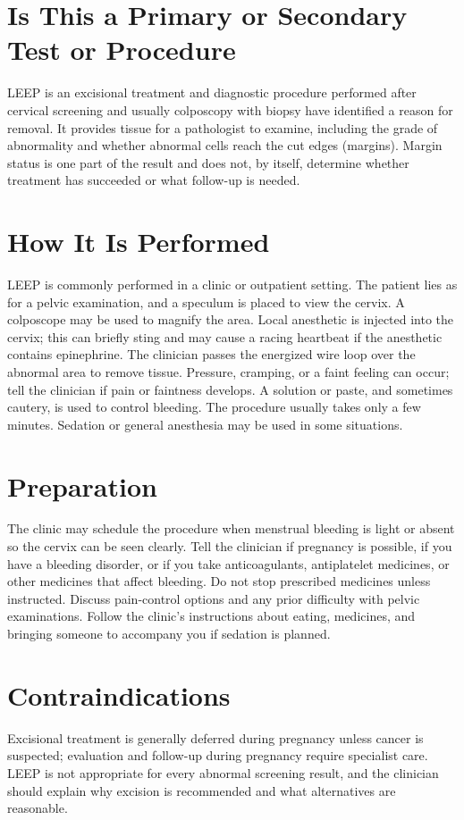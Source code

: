 \section*{Is This a Primary or Secondary Test or Procedure}
LEEP is an excisional treatment and diagnostic procedure performed after cervical screening and usually colposcopy with biopsy have identified a reason for removal. It provides tissue for a pathologist to examine, including the grade of abnormality and whether abnormal cells reach the cut edges (margins). Margin status is one part of the result and does not, by itself, determine whether treatment has succeeded or what follow-up is needed.

\section*{How It Is Performed}
LEEP is commonly performed in a clinic or outpatient setting. The patient lies as for a pelvic examination, and a speculum is placed to view the cervix. A colposcope may be used to magnify the area. Local anesthetic is injected into the cervix; this can briefly sting and may cause a racing heartbeat if the anesthetic contains epinephrine. The clinician passes the energized wire loop over the abnormal area to remove tissue. Pressure, cramping, or a faint feeling can occur; tell the clinician if pain or faintness develops. A solution or paste, and sometimes cautery, is used to control bleeding. The procedure usually takes only a few minutes. Sedation or general anesthesia may be used in some situations.

\section*{Preparation}
The clinic may schedule the procedure when menstrual bleeding is light or absent so the cervix can be seen clearly. Tell the clinician if pregnancy is possible, if you have a bleeding disorder, or if you take anticoagulants, antiplatelet medicines, or other medicines that affect bleeding. Do not stop prescribed medicines unless instructed. Discuss pain-control options and any prior difficulty with pelvic examinations. Follow the clinic's instructions about eating, medicines, and bringing someone to accompany you if sedation is planned.

\section*{Contraindications}
Excisional treatment is generally deferred during pregnancy unless cancer is suspected; evaluation and follow-up during pregnancy require specialist care. LEEP is not appropriate for every abnormal screening result, and the clinician should explain why excision is recommended and what alternatives are reasonable.

